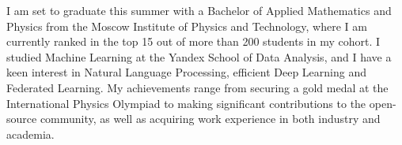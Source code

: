 
\begin{cvparagraph}

    I am set to graduate this summer with a Bachelor of Applied Mathematics and Physics from the Moscow Institute of Physics and Technology, where I am currently ranked in the top 15 out of more than 200 students in my cohort. I studied Machine Learning at the Yandex School of Data Analysis, and I have a keen interest in Natural Language Processing, efficient Deep Learning and Federated Learning. My achievements range from securing a gold medal at the International Physics Olympiad to making significant contributions to the open-source community, as well as acquiring work experience in both industry and academia.
    
\end{cvparagraph}
